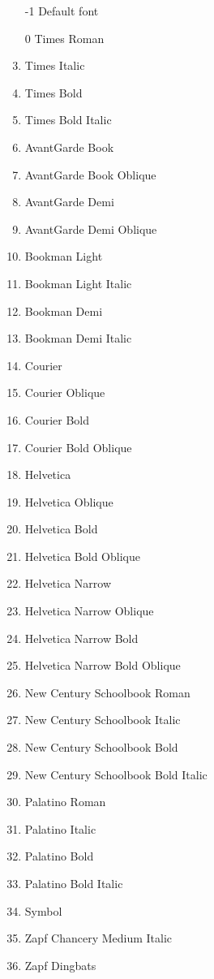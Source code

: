 \documentclass[10pt, a4paper]{article}
\begin{document}
\begin{enumerate}
\item[-1] Default font
\item[0]  Times Roman
\item     Times Italic
\item     Times Bold
\item     Times Bold Italic
\item     AvantGarde Book
\item     AvantGarde Book Oblique
\item     AvantGarde Demi
\item     AvantGarde Demi Oblique
\item     Bookman Light
\item     Bookman Light Italic
\item     Bookman Demi
\item     Bookman Demi Italic
\item     Courier
\item     Courier Oblique
\item     Courier Bold
\item     Courier Bold Oblique
\item     Helvetica
\item     Helvetica Oblique
\item     Helvetica Bold
\item     Helvetica Bold Oblique
\item     Helvetica Narrow
\item     Helvetica Narrow Oblique
\item     Helvetica Narrow Bold
\item     Helvetica Narrow Bold Oblique
\item     New Century Schoolbook Roman
\item     New Century Schoolbook Italic
\item     New Century Schoolbook Bold
\item     New Century Schoolbook Bold Italic
\item     Palatino Roman
\item     Palatino Italic
\item     Palatino Bold
\item     Palatino Bold Italic
\item     Symbol
\item     Zapf Chancery Medium Italic
\item     Zapf Dingbats
\end{enumerate}
      
\end{document}
